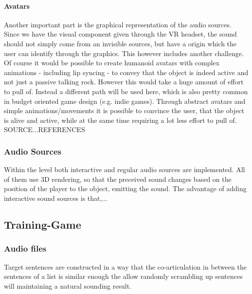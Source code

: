 \documentclass[a4paper,11pt]{article}%
\renewcommand{\\}{\vspace*{0.5\baselineskip} \newline}
\begin{document}
\paragraph{Avatars} Another important part is the graphical representation of the audio sources. Since we have the visual component given through the VR headset, the sound should not simply come from an invisible sources, but have a origin which the user can identify through the graphics. This however includes another challenge. Of course it would be possible to create humanoid avatars with complex animations - including lip syncing - to convey that the object is indeed active and not just a passive talking rock. However this would take a huge amount of effort to pull of. Instead a different path will be used here, which is also pretty common in budget oriented game design (e.g. indie games). Through abstract avatars and simple animations/movements it is possible to convince the user, that the object is alive and active, while at the same time requiring a lot less effort to pull of.
SOURCE...REFERENCES




\subsubsection{Audio Sources}
Within the level both interactive and regular audio sources are implemented. All of them use 3D rendering, so that the preceived sound changes based on the position of the player to the object, emitting the sound. The advantage of adding interactive sound sources is that,...

\subsection{Training-Game}
\label{sec:training_game}


\subsubsection{Audio files}
Target sentences are constructed in a way that the co-articulation in between the sentences of a list is similar enough the allow randomly scrambling up sentences will maintaining a natural sounding result.
\end{document}
